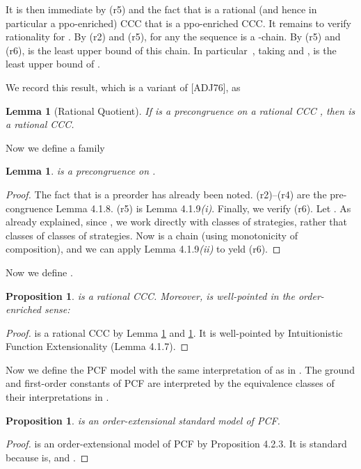 \documentclass[11pt]{article}
\newtheorem{lemma}[theorem]{Lemma}
\newtheorem{proposition}[theorem]{Proposition}
\begin{document}
 It is then immediate by (r5)
and the fact that  is a rational (and hence in particular a
ppo-enriched) CCC that  is a ppo-enriched CCC.
It remains to verify rationality for . By (r2) and (r5),
for any 
the sequence   is a -chain.
By (r5) and (r6),  is the least
upper bound of this chain. In particular~, taking  and
,  is the least upper bound of
.

We record this result, which is a variant of [ADJ76], as

\begin{lemma}[Rational Quotient]\label{5.1}
If  is a precongruence on a rational CCC , then 
is a rational CCC.
\end{lemma}

Now we define a family 

\begin{lemma}\label{5.2}
 is a precongruence on .
\end{lemma}
\begin{proof} The fact that  is a preorder has
already been noted. (r2)--(r4) are the pre-congruence Lemma 4.1.8.
(r5) is Lemma 4.1.9{\it (i)}. Finally, we verify (r6). Let
. As already explained, since , we work directly with classes of
strategies, rather that classes of classes of
strategies. Now  is a chain (using
monotonicity of composition), and we can apply Lemma
4.1.9{\it (ii)} to yeld (r6).
\end{proof}



Now we define .

\begin{proposition}\label{5.3}
 is a rational CCC. Moreover,  is well-pointed in the
order-enriched sense:

\end{proposition}
\begin{proof}  is a rational CCC by Lemma \ref{5.1} and
\ref{5.2}. It is well-pointed by Intuitionistic Function
Extensionality (Lemma 4.1.7).
\end{proof}



Now we define the PCF model  with the same interpretation
of  as in . The ground and first-order
constants of PCF are interpreted by the equivalence
classes of their interpretations in .

\begin{proposition}\label{5.4}
 is an order-extensional standard model of PCF.
\end{proposition}
\begin{proof}  is an order-extensional model of PCF by
Proposition 4.2.3. It is standard because 
is, and  .
\end{proof}
\end{document}
